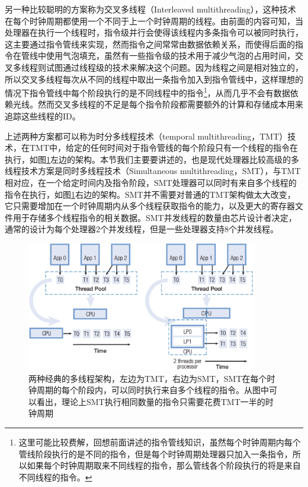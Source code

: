 另一种比较聪明的方案称为交叉多线程（Interleaved multithreading），这种技术在每个时钟周期都使用一个不同于上一个时钟周期的线程。由前面的内容可知，当处理器在执行一个线程时，指令级并行会使得该线程内多条指令可以被同时执行，这主要通过指令管线来实现，然而指令之间常常由数据依赖关系，而使得后面的指令在管线中使用气泡填充，虽然有一些指令级的技术用于减少气泡的占用时间，交叉多线程则试图通过线程级的技术来解决这个问题。因为线程之间是相对独立的，所以交叉多线程每次从不同的线程中取出一条指令加入到指令管线中，这样理想的情况下指令管线中每个阶段执行的是不同线程中的指令\footnote{这里可能比较费解，回想前面讲述的指令管线知识，虽然每个时钟周期内每个管线阶段执行的是不同的指令，但是每个时钟周期处理器只加入一条指令，所以如果每个时钟周期取来不同线程的指令，那么管线各个阶段执行的将是来自不同线程的指令。}，从而几乎不会有数据依赖光线。然而交叉多线程的不足是每个指令阶段都需要额外的计算和存储成本用来追踪这些线程的ID。

上述两种方案都可以称为时分多线程技术（temporal multithreading，TMT）技术，在TMT中，给定的任何时间对于指令管线的每个阶段只有一个线程的指令在执行，如图\ref{f:rp-smt}左边的架构。本节我们主要要讲述的，也是现代处理器比较高级的多线程技术方案是同时多线程技术（Simultaneous multithreading，SMT），与TMT相对应，在一个给定时间内及指令阶段，SMT处理器可以同时有来自多个线程的指令在执行，如图\ref{f:rp-smt}右边的架构。SMT并不需要对普通的TMT架构做太大改变，它只需要增加在一个时钟周期内从多个线程获取指令的能力，以及更大的寄存器文件用于存储多个线程指令的相关数据。SMT并发线程的数量由芯片设计者决定，通常的设计为每个处理器2个并发线程，但是一些处理器支持8个并发线程。

\begin{figure}
	\includegraphics[width=0.9\textwidth]{figures/rp/smt}
	\caption{两种经典的多线程架构，左边为TMT，右边为SMT，SMT在每个时钟周期的每个阶段内，可以同时执行来自多个线程的指令。从图中可以看出，理论上SMT执行相同数量的指令只需要花费TMT一半的时钟周期}
	\label{f:rp-smt}
\end{figure}



